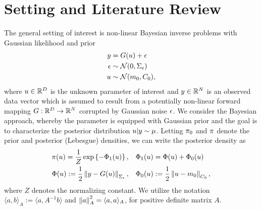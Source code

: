 \documentclass[12pt]{article}
\begin{document}
\section{Setting and Literature Review}
The general setting of interest is non-linear Bayesian inverse problems with Gaussian likelihood and prior
\begin{align}
y &= G(u) + \epsilon \label{inverse_problem} \\
\epsilon &\sim \mathcal{N}(0, \Sigma_{\epsilon}) \nonumber \\
u &\sim \mathcal{N}(m_0, C_0), \nonumber
\end{align}
where $u \in \mathbb{R}^{D}$ is the unknown parameter of interest and $y \in \mathbb{R}^{N}$ is an observed 
data vector which is assumed to result from a potentially non-linear forward mapping $G: \mathbb{R}^{D} \to \mathbb{R}^{N}$
corrupted by Gaussian noise $\epsilon$. We consider the Bayesian approach, whereby the parameter is equipped with 
Gaussian prior and the goal is to characterize the posterior distribution $u|y \sim \mu$. Letting
$\pi_0$ and $\pi$ denote the prior and posterior (Lebesgue) densities, we can write the posterior density 
as 
\begin{align*}
&\pi(u) = \frac{1}{Z} \exp\left\{-\Phi_1(u) \right\}, &&\Phi_1(u) = \Phi(u) + \Phi_0(u) \\
&\Phi(u) := \frac{1}{2}\left\lVert y - G(u)\right\rVert_{\Sigma_{\epsilon}}, &&\Phi_0(u) := \frac{1}{2} \left\lVert u-m_0\right\rVert_{C_0},
\end{align*}
where $Z$ denotes the normalizing constant. 
We utilize the notation $\langle a, b \rangle_{A} := \langle a, A^{-1} b \rangle$ and $\left\lVert a\right\rVert_A^2 = \langle a, a \rangle_{A}$, for positive 
definite matrix $A$. 
\end{document}
